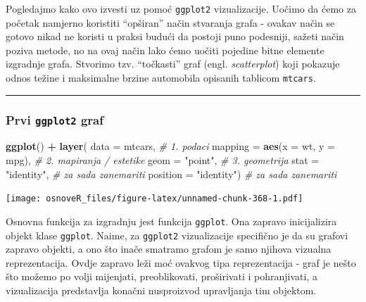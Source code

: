 \documentclass[]{book}
\newenvironment{Shaded}{\begin{snugshade}}{\end{snugshade}}
\newcommand{\KeywordTok}[1]{\textcolor[rgb]{0.13,0.29,0.53}{\textbf{#1}}}
\newcommand{\DataTypeTok}[1]{\textcolor[rgb]{0.13,0.29,0.53}{#1}}
\newcommand{\StringTok}[1]{\textcolor[rgb]{0.31,0.60,0.02}{#1}}
\newcommand{\CommentTok}[1]{\textcolor[rgb]{0.56,0.35,0.01}{\textit{#1}}}
\newcommand{\OperatorTok}[1]{\textcolor[rgb]{0.81,0.36,0.00}{\textbf{#1}}}
\newcommand{\NormalTok}[1]{#1}
\theoremstyle{definition}
\theoremstyle{definition}
\theoremstyle{definition}
\theoremstyle{remark}
\begin{document}
Pogledajmo kako ovo izvesti uz pomoć \texttt{ggplot2} vizualizacije.
Uočimo da ćemo za početak namjerno koristiti ``opširan'' način stvaranja
grafa - ovakav način se gotovo nikad ne koristi u praksi budući da
postoji puno podesniji, sažeti način poziva metode, no na ovaj način
lako ćemo uočiti pojedine bitne elemente izgradnje grafa. Stvorimo tzv.
``točkasti'' graf (engl. \emph{scatterplot}) koji pokazuje odnos težine
i maksimalne brzine automobila opisanih tablicom \texttt{mtcars}.

\begin{center}\rule{0.5\linewidth}{\linethickness}\end{center}

\subsubsection{\texorpdfstring{Prvi \texttt{ggplot2}
graf}{Prvi ggplot2 graf}}\label{prvi-ggplot2-graf}

\begin{Shaded}
\begin{Highlighting}[]
\KeywordTok{ggplot}\NormalTok{() }\OperatorTok{+}\StringTok{ }
\KeywordTok{layer}\NormalTok{( }\DataTypeTok{data =}\NormalTok{ mtcars,                      }\CommentTok{# 1. podaci}
       \DataTypeTok{mapping =} \KeywordTok{aes}\NormalTok{(}\DataTypeTok{x =}\NormalTok{ wt, }\DataTypeTok{y =}\NormalTok{ mpg),     }\CommentTok{# 2. mapiranja / estetike}
       \DataTypeTok{geom =} \StringTok{"point"}\NormalTok{,                     }\CommentTok{# 3. geometrija}
       \DataTypeTok{stat =} \StringTok{"identity"}\NormalTok{,                  }\CommentTok{# za sada zanemariti}
       \DataTypeTok{position =} \StringTok{"identity"}\NormalTok{)              }\CommentTok{# za sada zanemariti}
\end{Highlighting}
\end{Shaded}

\texttt{[image: osnoveR\_files/figure-latex/unnamed-chunk-368-1.pdf]}

Osnovna funkcija za izgradnju jest funkcija \texttt{ggplot}. Ona zapravo
inicijalizira objekt klase \texttt{ggplot}. Naime, za \texttt{ggplot2}
vizualizacije specifično je da su grafovi zapravo objekti, a ono što
inače smatramo grafom je samo njihova vizualna reprezentacija. Ovdje
zapravo leži moć ovakvog tipa reprezentacija - graf je nešto što možemo
po volji mijenjati, preoblikovati, proširivati i pohranjivati, a
vizualizacija predstavlja konačni nusproizvod upravljanja tim objektom.
\end{document}
